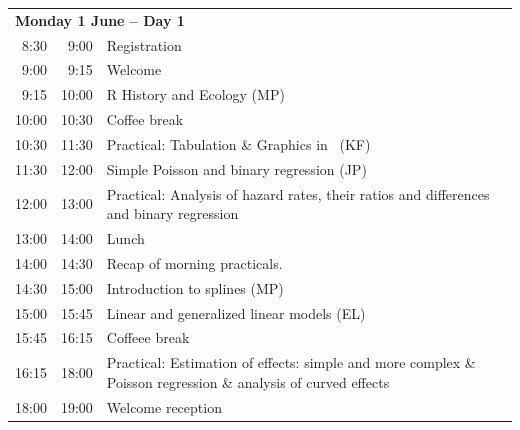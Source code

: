 \documentclass[a4paper, 12pt]{article}
\begin{document}
\noindent
\begin{tabular}{r@{ -- }rp{13cm}}
\multicolumn{3}{l}{\bf Monday 1 June -- Day 1} \\
 8:30 &  9:00 & Registration \\
 9:00 &  9:15 & Welcome  \\
 9:15 & 10:00 & R History and Ecology (MP)\\%
10:00 & 10:30 & Coffee break \\
10:30 & 11:30 & Practical: Tabulation \& Graphics in \R\ (KF)\\ %
11:30 & 12:00 & Simple Poisson and binary regression (JP)\\ %
12:00 & 13:00 & Practical: Analysis of hazard rates, their ratios and differences and binary regression\\
13:00 & 14:00 & Lunch \\
14:00 &  14:30 & Recap of morning practicals. \\
14:30 & 15:00 & Introduction to splines (MP)\\ %
15:00 & 15:45 & Linear and generalized linear models (EL)\\ %
15:45 & 16:15 & Coffeee break \\
16:15 & 18:00 & Practical:  Estimation of effects: simple and more complex \& Poisson regression \& analysis of curved effects\\ %
18:00 & 19:00 & Welcome reception  \\[1em]
\end{tabular}
\end{document}
